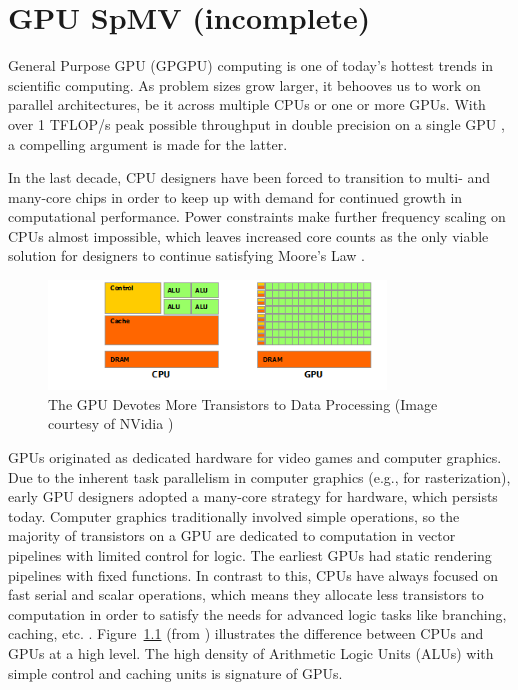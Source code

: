 \documentclass{report}
\begin{document}
\fi

\chapter{GPU SpMV (incomplete)}
\label{chap:gpu_rbffd}

General Purpose GPU (GPGPU) computing is one of today's hottest trends in scientific computing. As problem sizes grow larger, it behooves us to work on parallel architectures, be it across multiple CPUs or one or more GPUs. With over 1 TFLOP/s peak possible throughput in double precision on a single GPU \cite{KeplerFactSheet}, a compelling argument is made for the latter. 

In the last decade, CPU designers have been forced to transition to multi- and many-core chips in order to keep up with demand for continued growth in computational performance. 
Power constraints make further frequency scaling on CPUs almost impossible, which leaves increased core counts as the only viable solution for designers to continue satisfying Moore's Law \cite{Owens2007}. 

\begin{figure}
\centering
\includegraphics[width=0.8\textwidth]{gpu_content/nvidia_figures/gpu-devotes-more-transistors-to-data-processing.png}
\caption{The GPU Devotes More Transistors to Data Processing (Image courtesy of NVidia \cite{CudaGuide2013})} 
\label{fig:gpu-devotes-more-transistors-to-data-processing}
\end{figure}

GPUs originated as dedicated hardware for video games and computer graphics. 
Due to the inherent task parallelism in computer graphics  (e.g., for rasterization), early GPU designers adopted a many-core strategy for hardware, which persists today. Computer graphics traditionally involved simple operations, so the majority of transistors on a GPU are dedicated to computation in vector pipelines with limited control for logic. The earliest GPUs had static rendering pipelines with fixed functions. In contrast to this, CPUs have always focused on fast serial and scalar operations, which means they allocate less transistors to computation in order to satisfy the needs for advanced logic tasks like branching, caching, etc. \cite{Owens2007,CudaGuide2013}. Figure~\ref{fig:gpu-devotes-more-transistors-to-data-processing} (from \cite{CudaGuide2013}) illustrates the difference between CPUs and GPUs at a high level. The high density of Arithmetic Logic Units (ALUs) with simple control and caching units is signature of GPUs. 
\end{document}
